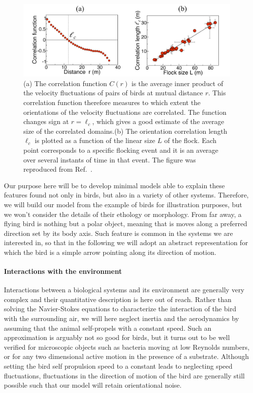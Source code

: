 \begin{figure}[t]
\begin{center}
	\includegraphics[width=.75\textwidth]{Figures/scalefree.pdf}
	\caption{(a) The correlation function $C(r)$ is the average inner product of the velocity fluctuations of pairs of birds at mutual distance $r$. This correlation function therefore measures to which extent the orientations of the velocity fluctuations are correlated. The function changes sign at $r=\ell_c$, which gives a good estimate of the average size of the correlated domains.(b) The orientation correlation length $\ell_c$ is plotted as a function of the linear size $L$ of the flock. Each point corresponds to a specific flocking event and it is an average over several instants of time in that event. The figure was reproduced from Ref.~\cite{cavagna2010scale}.
	}
	\label{scalefree}
	\end{center}
\end{figure}

Our purpose here will be to develop minimal models able to explain these features found not only in birds, but also in a variety of other systems.
Therefore, we will build our model from the example of birds for illustration purposes, but we won't consider the details of their ethology or morphology.
From far away, a flying bird is nothing but a polar object, meaning that is moves along a preferred direction set by its body axis.
Such feature is common in the systems we are interested in, so that in the following we will adopt an abstract representation
for which the bird is a simple arrow pointing along its direction of motion.

\paragraph*{Interactions with the environment}
Interactions between a biological systems and its environment are generally very complex and their quantitative description is here out of reach. 
Rather than solving the Navier-Stokes equations
to characterize the interaction of the bird with the surrounding air, 
we will here neglect inertia and the aerodynamics by assuming that the animal self-propels with a constant speed.
Such an approximation is arguably not so good for birds, but it turns out to be well verified for microscopic objects such as bacteria moving at low Reynolds numbers, or for any two dimensional active motion in the presence of a substrate.
Although setting the bird self propulsion speed to a constant leads to neglecting speed fluctuations, fluctuations in the direction of motion of the bird are generally still possible such that our model will retain orientational noise. 
 
